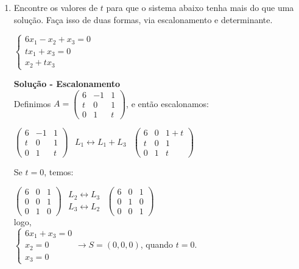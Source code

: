 \documentclass[12pt]{article}
\begin{document}
\begin{enumerate}
	\item Encontre os valores de $t$ para que o sistema abaixo tenha mais do que uma solução. Faça isso de duas formas, via escalonamento e determinante.
	\begin{center}
		$\begin{cases}
			6x_1 - x_2 + x_3 = 0 \\
			tx_1 + x_3 = 0 \\
			x_2 + tx_3
		\end{cases}$
	\end{center}
	\textbf{Solução - Escalonamento\\[10pt]}
	Definimos $A = \begin{pmatrix} 6 & -1 & 1 \\ t & 0 & 1 \\ 0 & 1 & t \end{pmatrix}$, e então escalonamos:
	\begin{center}
		$\begin{pmatrix} 6 & -1 & 1 \\ t & 0 & 1 \\ 0 & 1 & t \end{pmatrix}$
		$\begin{matrix} L_1 \leftrightarrow L_1 + L_3	 \end{matrix}$
		$\begin{pmatrix} 6 & 0 & 1 + t \\ t & 0 & 1 \\ 0 & 1 & t \end{pmatrix}$
	\end{center}
	Se $t = 0$, temos:
	\begin{center}
		$\begin{pmatrix} 6 & 0 & 1 \\ 0 & 0 & 1 \\ 0 & 1 & 0 \end{pmatrix}$
		$\begin{matrix} L_2 \leftrightarrow L_3 \\ L_3 \leftrightarrow L_2 \end{matrix}$
		$\begin{pmatrix} 6 & 0 & 1 \\ 0 & 1 & 0 \\ 0 & 0 & 1 \end{pmatrix}$\\[10pt]
		logo,\\[10pt]
		$\begin{cases}6x_1 + x_3 = 0\\x_2 = 0\\x_3 = 0\end{cases} \rightarrow S = (0, 0, 0)$, quando $t = 0$. 

\end{center}
\end{enumerate}
\end{document}
